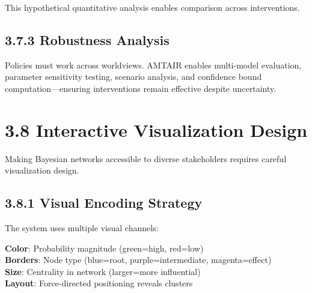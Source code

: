 \documentclass[
  11pt,
  letterpaper,
]{book}
\begin{document}
This hypothetical quantitative analysis enables comparison across
interventions.

\subsection*{3.7.3 Robustness Analysis}\label{sec-robustness}

\begin{tcolorbox}[enhanced jigsaw, arc=.35mm, titlerule=0mm, breakable, toprule=.15mm, toptitle=1mm, colframe=quarto-callout-tip-color-frame, coltitle=black, bottomrule=.15mm, bottomtitle=1mm, opacityback=0, title=\textcolor{quarto-callout-tip-color}{\faLightbulb}\hspace{0.5em}{Cross-Worldview Robustness}, rightrule=.15mm, leftrule=.75mm, colback=white, colbacktitle=quarto-callout-tip-color!10!white, opacitybacktitle=0.6, left=2mm]

Policies must work across worldviews. AMTAIR enables multi-model
evaluation, parameter sensitivity testing, scenario analysis, and
confidence bound computation---ensuring interventions remain effective
despite uncertainty.

\end{tcolorbox}

\section*{3.8 Interactive Visualization
Design}\label{sec-visualization-design}


Making Bayesian networks accessible to diverse stakeholders requires
careful visualization design.

\subsection*{3.8.1 Visual Encoding Strategy}\label{sec-visual-encoding}

The system uses multiple visual channels:

\textbf{Color}: Probability magnitude (green=high, red=low)\\
\textbf{Borders}: Node type (blue=root, purple=intermediate,
magenta=effect)\\
\textbf{Size}: Centrality in network (larger=more influential)\\
\textbf{Layout}: Force-directed positioning reveals clusters
\end{document}

